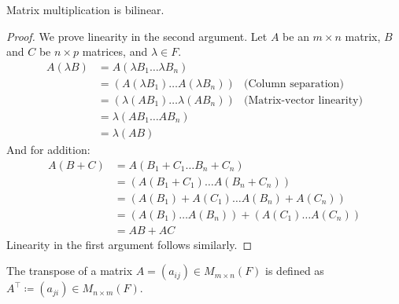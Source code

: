 \documentclass[../linear_algebra_and_groups.tex]{subfiles}
\begin{document}
\begin{corollary}
    \begin{shaded*}
        Matrix multiplication is bilinear. 
    \end{shaded*}
\end{corollary}
\begin{proof}
    We prove linearity in the second argument. Let $A$ be an $m \times n$ matrix, $B$ and $C$ be $n \times p$ matrices, and $\lambda \in F$.
    \begin{align*}
        A(\lambda B) &= A(\lambda B_1 \dots \lambda B_n) \\
        &= (A(\lambda B_1) \dots A(\lambda B_n)) & \text{(Column separation)} \\
        &= (\lambda(AB_1) \dots \lambda(AB_n)) & \text{(Matrix-vector linearity)} \\
        &= \lambda(AB_1 \dots AB_n) \\
        &= \lambda(AB)
    \end{align*}
    And for addition:
    \begin{align*}
        A(B+C) &= A(B_1+C_1 \dots B_n+C_n) \\
        &= (A(B_1+C_1) \dots A(B_n+C_n)) \\
        &= (A(B_1)+A(C_1) \dots A(B_n)+A(C_n)) \\
        &= (A(B_1) \dots A(B_n)) + (A(C_1) \dots A(C_n)) \\
        &= AB+AC
    \end{align*}
    Linearity in the first argument follows similarly.
    \qedhere
\end{proof}

\begin{definition}[Transpose]
    \begin{shaded*}
        The transpose of a matrix $A=(a_{ij}) \in M_{m \times n}(F)$ is defined as $A^\top\coloneqq(a_{ji}) \in M_{n \times m}(F)$.
    \end{shaded*}
\end{definition}
\end{document}
